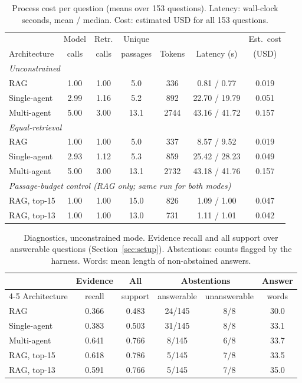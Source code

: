 \documentclass[11pt,a4paper]{article}
\begin{document}
\begin{table}[t]
\centering
\small
\setlength{\tabcolsep}{5pt}
\caption{Process cost per question (means over 153 questions). Latency:
wall-clock seconds, mean / median. Cost: estimated USD for all 153
questions.}
\label{tab:cost}
\begin{tabular}{lcccccc}
\toprule
 & Model & Retr. & Unique & & & Est.\ cost \\
Architecture & calls & calls & passages & Tokens & Latency (s) & (USD) \\
\midrule
\multicolumn{7}{l}{\emph{Unconstrained}} \\
\quad RAG & 1.00 & 1.00 & 5.0 & 336 & 0.81 / 0.77 & 0.019 \\
\quad Single-agent & 2.99 & 1.16 & 5.2 & 892 & 22.70 / 19.79 & 0.051 \\
\quad Multi-agent & 5.00 & 3.00 & 13.1 & 2744 & 43.16 / 41.72 & 0.157 \\
\midrule
\multicolumn{7}{l}{\emph{Equal-retrieval}} \\
\quad RAG & 1.00 & 1.00 & 5.0 & 337 & 8.57 / 9.52 & 0.019 \\
\quad Single-agent & 2.93 & 1.12 & 5.3 & 859 & 25.42 / 28.23 & 0.049 \\
\quad Multi-agent & 5.00 & 3.00 & 13.1 & 2732 & 43.18 / 41.76 & 0.157 \\
\midrule
\multicolumn{7}{l}{\emph{Passage-budget control (RAG only; same run for both modes)}} \\
\quad RAG, top-15 & 1.00 & 1.00 & 15.0 & 826 & 1.09 / 1.00 & 0.047 \\
\quad RAG, top-13 & 1.00 & 1.00 & 13.0 & 731 & 1.11 / 1.01 & 0.042 \\
\bottomrule
\end{tabular}
\end{table}

\begin{table}[t]
\centering
\small
\caption{Diagnostics, unconstrained mode. Evidence recall and all support
over answerable questions (Section~\ref{sec:setup}). Abstentions: counts
flagged by the harness. Words: mean length of non-abstained answers.}
\label{tab:diag}
\begin{tabular}{lccccc}
\toprule
 & Evidence & All & \multicolumn{2}{c}{Abstentions} & Answer \\
\cmidrule(lr){4-5}
Architecture & recall & support & answerable & unanswerable & words \\
\midrule
RAG & 0.366 & 0.483 & 24/145 & 8/8 & 30.0 \\
Single-agent & 0.383 & 0.503 & 31/145 & 8/8 & 33.1 \\
Multi-agent & 0.641 & 0.766 & 8/145 & 6/8 & 33.7 \\
RAG, top-15 & 0.618 & 0.786 & 5/145 & 7/8 & 33.5 \\
RAG, top-13 & 0.591 & 0.766 & 5/145 & 7/8 & 35.0 \\
\bottomrule
\end{tabular}
\end{table}
\end{document}
